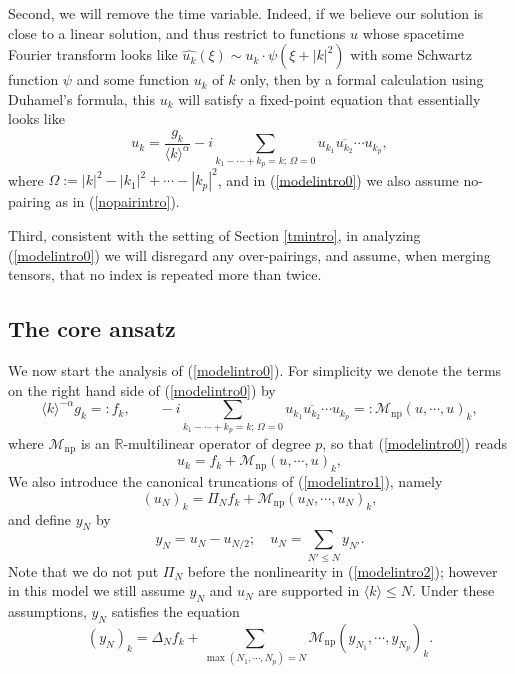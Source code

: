 \documentclass[11 pt,reqno]{amsart}
\theoremstyle{definition}
\theoremstyle{remark}
\numberwithin{equation}{section}
\renewcommand{\Mc}{\mathcal{M}}
\newcommand{\Rb}{\mathbb{R}}
\begin{document}
Second, we will remove the time variable. Indeed, if we believe our solution is close to a linear solution, and thus restrict to functions $u$ whose spacetime Fourier transform looks like $
\widehat{u_k}(\xi)\sim u_k\cdot\psi(\xi+|k|^2)$ with some Schwartz function $\psi$ and some function $u_k$ of $k$ only, then by a formal calculation using Duhamel's formula, this $u_k$ will satisfy a fixed-point equation that essentially looks like \begin{equation}\label{modelintro0}u_k=\frac{g_k}{\langle k\rangle^{\alpha}}-i\sum_{k_1-\cdots +k_p=k;\,\Omega=0}u_{k_1}\overline{u_{k_2}}\cdots u_{k_p},\end{equation} where $\Omega:=|k|^2-|k_1|^2+\cdots-|k_p|^2$, and in (\ref{modelintro0}) we also assume no-pairing as in (\ref{nopairintro}).

Third, consistent with the setting of Section \ref{tmintro}, in analyzing (\ref{modelintro0}) we will disregard any over-pairings, and assume, when merging tensors, that no index is repeated more than twice.
 \subsection{The core ansatz}\label{simansatz} We now start the analysis of (\ref{modelintro0}). For simplicity we denote the terms on the right hand side of (\ref{modelintro0}) by \begin{equation}\label{deffintro}\langle k\rangle^{-\alpha}g_k=:f_k,\qquad -i\sum_{k_1-\cdots +k_p=k;\,\Omega=0}u_{k_1}\overline{u_{k_2}}\cdots u_{k_p}=:\Mc_{\mathrm{np}}(u,\cdots,u)_k,\end{equation} where $\Mc_{\mathrm{np}}$ is an $\Rb$-multilinear operator of degree $p$, so that (\ref{modelintro0}) reads \begin{equation}\label{modelintro1}
u_k = f_k + \Mc_{\mathrm{np}}(u,\cdots, u)_k,
\end{equation} We also introduce the canonical truncations of (\ref{modelintro1}), namely \begin{equation}\label{modelintro2}
(u_N)_k = \Pi_N f_k + \Mc_{\mathrm{np}}(u_N,\cdots, u_N)_k,
\end{equation} and define $y_N$  by 
\begin{equation}
y_N = u_N-u_{N/2};\quad u_N=\sum_{N'\leq N}y_{N'}.
\end{equation}Note that we do not put $\Pi_N$ before the nonlinearity in (\ref{modelintro2}); however in this model we still assume $y_N$ and $u_N$ are supported in $\langle k\rangle\leq N$. Under these assumptions, $y_N$ satisfies the equation
\begin{equation}\label{modelintro3}(y_N)_k=\Delta_N f_k+\sum_{\max(N_1,\cdots,N_p)=N}\Mc_{\mathrm{np}}(y_{N_1},\cdots,y_{N_p})_k.
\end{equation}
\end{document}
